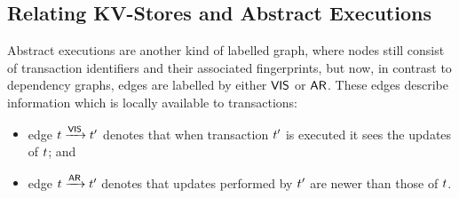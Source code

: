 \subsection{Relating KV-Stores and Abstract Executions}
Abstract executions are another kind of labelled 
graph, where nodes still consist of transaction identifiers and  their 
associated fingerprints, 
but now,  %
in contrast to  dependency graphs, edges are labelled by either  $\mathsf{VIS}$
or $\mathsf{AR}$. These edges describe  information  which is locally available to  transactions: 
\begin{itemize}
\item edge $t \xrightarrow{\mathsf{VIS}} t'$ denotes that  when transaction 
$t'$ is executed  it sees the updates of $t$; and 
\item edge $t \xrightarrow{\mathsf{AR}} t'$ denotes  that updates 
performed by $t'$ are newer than those of $t$. 
\end{itemize}
